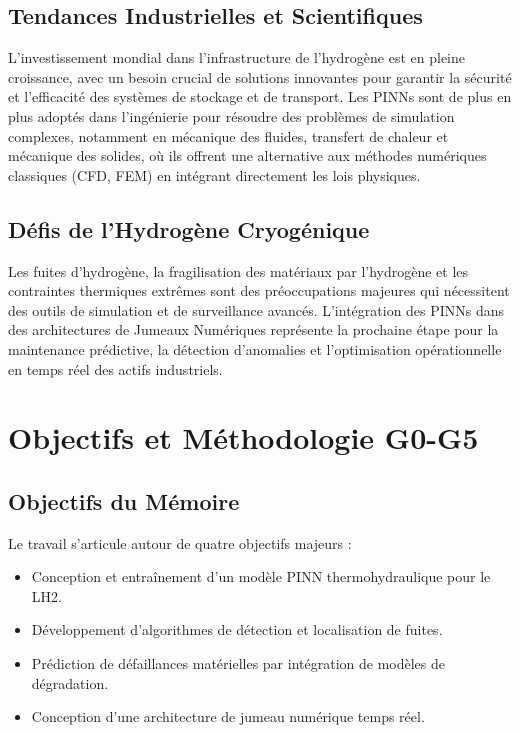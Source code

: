 \documentclass[12pt,a4paper,oneside]{report}
\begin{document}
\section{Tendances Industrielles et Scientifiques}
L'investissement mondial dans l'infrastructure de l'hydrogène est en pleine croissance, avec un besoin crucial de solutions innovantes pour garantir la sécurité et l'efficacité des systèmes de stockage et de transport. Les PINNs sont de plus en plus adoptés dans l'ingénierie pour résoudre des problèmes de simulation complexes, notamment en mécanique des fluides, transfert de chaleur et mécanique des solides, où ils offrent une alternative aux méthodes numériques classiques (CFD, FEM) en intégrant directement les lois physiques.

\section{Défis de l'Hydrogène Cryogénique}
Les fuites d'hydrogène, la fragilisation des matériaux par l'hydrogène et les contraintes thermiques extrêmes sont des préoccupations majeures qui nécessitent des outils de simulation et de surveillance avancés. L'intégration des PINNs dans des architectures de Jumeaux Numériques représente la prochaine étape pour la maintenance prédictive, la détection d'anomalies et l'optimisation opérationnelle en temps réel des actifs industriels.

\chapter{Objectifs et Méthodologie G0-G5}
\section{Objectifs du Mémoire}
Le travail s'articule autour de quatre objectifs majeurs :
\begin{itemize}
    \item Conception et entraînement d'un modèle PINN thermohydraulique pour le LH2.
    \item Développement d'algorithmes de détection et localisation de fuites.
    \item Prédiction de défaillances matérielles par intégration de modèles de dégradation.
    \item Conception d'une architecture de jumeau numérique temps réel.
\end{itemize}
\end{document}
